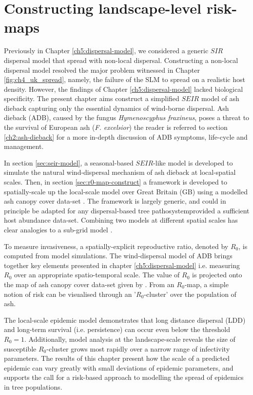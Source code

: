 \chapter{Constructing landscape-level risk-maps}

Previously in Chapter \ref{ch5:dispersal-model}, we considered a generic $SIR$ dispersal model that spread with non-local dispersal. 
Constructing a non-local dispersal model resolved the major problem witnessed in Chapter \ref{fig:ch4_uk_spread}, namely, the failure of the SLM to spread on a realistic host density. 
However, the findings of Chapter \ref{ch5:dispersal-model} lacked biological specificity.
The present chapter aims construct a simplified $SEIR$ model of ash dieback capturing only the essential dynamics of wind-borne dispersal.
Ash dieback (ADB), caused by the fungus \textit{Hymenoscyphus fraxineus}, poses a threat to the survival of European ash (\textit{F. excelsior})\textemdash
the reader is referred to section \ref{ch2:ash-dieback} for a more in-depth discussion of ADB symptoms, life-cycle and management.

In section \ref{sec:seir-model}, a seasonal-based $SEIR$-like model is developed to simulate the natural wind-dispersal mechanism of ash dieback at local-spatial scales. 
Then, in section \ref{sec:r0-map-construct} a framework is developed to spatially-scale up the local-scale model over Great Britain (GB) using a modelled ash canopy cover data-set \cite{hill.data}.
The framework is largely generic, and could in principle be adapted for any dispersal-based tree pathosystem\textemdash provided a sufficient host abundance data-set.
Combining two models at different spatial scales has clear analogies to a sub-grid model \cite{sub-grid}.
 
To measure invasiveness, a spatially-explicit reproductive ratio, denoted by $R_0$, is computed from model simulations.
The wind-dispersal model of ADB brings together key elements presented in chapter \ref{ch5:dispersal-model} i.e. measuring $R_0$ over an appropriate spatio-temporal scale.
The value of $R_0$ is projected onto the map of ash canopy cover data-set given by \cite{hill.data}.
From an $R_0$-map, a simple notion of risk can be visualised through an '$R_0$-cluster' over the population of ash.

The local-scale epidemic model demonstrates that long distance dispersal (LDD) and long-term survival (i.e. persistence)  
can occur even below the threshold $R_0=1$.
Additionally, model analysis at the landscape-scale reveals the size of susceptible $R_0$-cluster grows most rapidly over a narrow range of infectivity parameters.
The results of this chapter present how the scale of a predicted epidemic can vary greatly with small deviations of epidemic parameters,
and supports the call for a risk-based approach to modelling the spread of epidemics in tree populations.

